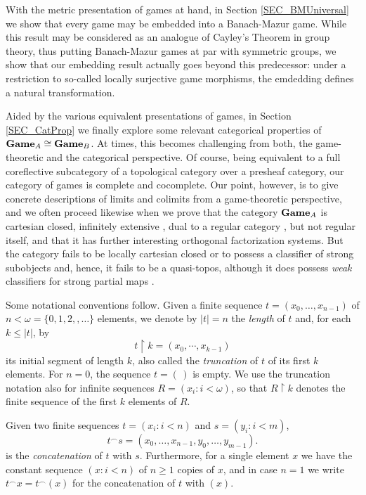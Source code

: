 \documentclass[12pt]{amsart}
\theoremstyle{definition}
\newcommand{\seq}[1]{{\left( {#1} \right)}}
\newcommand{\A}{\textup{\textmd{\textsc{A}}}}
\newcommand{\B}{\textup{\textmd{\textsc{B}}}}
\newcommand{\Games}{\mathbf{Game}}
\begin{document}
With the metric presentation of games at hand, in Section \ref{SEC_BMUniversal} we show that every game may be embedded into a Banach-Mazur game. While this result may be considered as an analogue of Cayley's Theorem in group theory, thus putting Banach-Mazur games at par with symmetric groups, we show that our embedding result actually goes beyond this predecessor: under a restriction to so-called locally surjective game morphisms, the emdedding defines a natural transformation. 

Aided by the various equivalent presentations of games, in Section \ref{SEC_CatProp} we finally explore some relevant categorical properties of $\Games_\A\cong\Games_\B$. At times, this becomes challenging from both, the game-theoretic and the categorical perspective. Of course, being equivalent to a full coreflective subcategory of a topological category over a presheaf category, our category of games is complete and cocomplete. Our point, however, is to give concrete descriptions of limits and colimits from a game-theoretic perspective, and we often proceed likewise when we prove that the category $\Games_\A$ is cartesian closed, infinitely extensive \cite{Carboni1993, Centazzo2004}, dual to a regular category \cite{Bourn2004}, but not regular itself, and that it has further interesting orthogonal factorization systems. But the category fails to be locally cartesian closed or to possess a classifier of strong subobjects and, hence, it fails to be a quasi-topos, although it does possess \emph{weak} classifiers for strong partial maps \cite{Adamek1990}. 

\medskip
Some notational conventions follow. Given a finite sequence $t = \seq{x_0, \dotsc, x_{n-1}}$ of $n<\omega=\{0,1,2,,\dotsc\}$ elements, we denote by $|t|=n$ the \textit{length} of $t$ and, for each $k\le |t|$, by 
\[t\upharpoonright k=\seq{x_0,\cdots,x_{k-1}}
\]
its initial segment of length $k$, also called the \textit{truncation} of $t$ of its first $k$ elements. For $n=0$, the sequence $t=\seq{\,}$ is empty. We use the truncation notation also for infinite sequences $R=\seq{x_i:i<\omega}$, so that $R\upharpoonright k$ denotes the finite sequence of the first $k$ elements of $R$.

Given two finite sequences $t=\seq{x_i: i< n}$ and $s=\seq{y_i:i< m}$, 
\[
t^\smallfrown s = \seq{x_0, \dotsc, x_{n-1}, y_0, \dotsc, y_{m-1}}.
\]
is the \textit{concatenation} of $t$ with $s$.	
Furthermore, for a single element $x$ we have the constant sequence $\seq{x: i< n}$ of $n\ge 1$ copies of $x$, and in case $n=1$ we write $t^\smallfrown x = t^\smallfrown \seq{x}$ for the concatenation of $t$ with $\seq{x}$.
\end{document}
